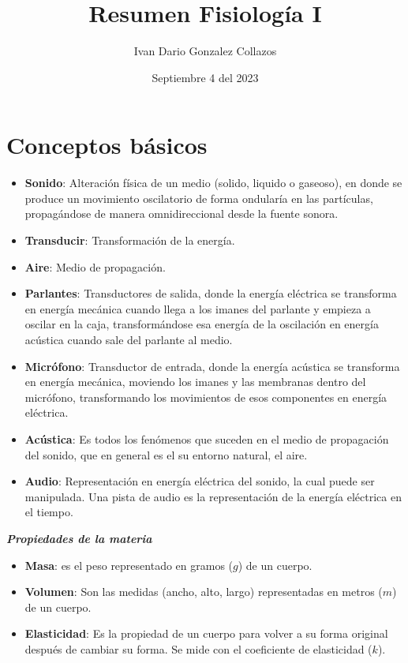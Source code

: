 \documentclass{article}
\title{Resumen Fisiología I}
\author{Ivan Dario Gonzalez Collazos}
\date{Septiembre 4 del 2023}
\begin{document}
\maketitle

\section{Conceptos básicos}

\begin{itemize}
    \item \textbf{Sonido}: Alteración física de un medio (solido, liquido o gaseoso), en donde se produce un movimiento oscilatorio de forma ondularía en las partículas, propagándose de manera omnidireccional desde la fuente sonora.
    \item \textbf{Transducir}: Transformación de la energía.
    \item \textbf{Aire}: Medio de propagación. 
    \item \textbf{Parlantes}: Transductores de salida, donde la energía eléctrica se transforma en energía mecánica cuando llega a los imanes del parlante y empieza a oscilar en la caja, transformándose esa energía de la oscilación en energía acústica cuando sale del parlante al medio.
    \item \textbf{Micrófono}: Transductor de entrada, donde la energía acústica se transforma en energía mecánica, moviendo los imanes y las membranas dentro del micrófono, transformando los movimientos de esos componentes en energía eléctrica.
    \item \textbf{Acústica}: Es todos los fenómenos que suceden en el medio de propagación del sonido, que en general es el su entorno natural, el aire.
    \item \textbf{Audio}: Representación en energía eléctrica del sonido, la cual puede ser manipulada. Una pista de audio es la representación de la energía eléctrica en el tiempo.
\end{itemize}

\textbf{\textit{Propiedades de la materia}}

\begin{itemize}
    \item \textbf{Masa}: es el peso representado en gramos ($g$) de un cuerpo.
    \item \textbf{Volumen}: Son las medidas (ancho, alto, largo) representadas en metros ($m$) de un cuerpo.
    \item \textbf{Elasticidad}: Es la propiedad de un cuerpo para volver a su forma original después de cambiar su forma. Se mide con el coeficiente de elasticidad ($k$).
\end{itemize}
\end{document}
